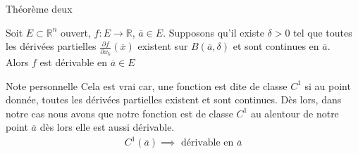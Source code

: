 \begin{parag}{Théorème deux}
    \begin{theoreme}
        Soit $E \subset \mathbb{R}^n $ ouvert,  $f: E \to \mathbb{R}$, $\overline{a} \in E$. Supposons qu'il existe $ \delta > 0$ tel que toutes les dérivées partielles $ \frac{\partial f}{\partial x_k}( \overline{x})$ existent sur $B( \overline{a}, \delta)$ et sont continues en $\overline{a}$.\\
        Alors $f$ est dérivable en $\overline{a} \in E$
    \end{theoreme}
    \begin{subparag}{Note personnelle}
        Cela est vrai car, une fonction est dite de classe $C^1$ si au point donnée, toutes les dérivées partielles existent et sont continues. Dès lors, dans notre cas nous avons que notre fonction est de classe $C^1$ au alentour de notre point $\overline{a}$ dès lors elle est aussi dérivable.
        \begin{align*} C^1\left(\overline{a}\right)  \implies \text{ dérivable en } \overline{a} \end{align*}
    \end{subparag}
    
\end{parag}


